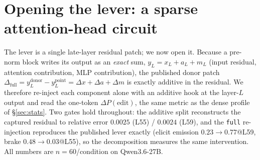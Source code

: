 
\section{Opening the lever: a sparse attention-head circuit}\label{sec:decomp}
The lever is a single late-layer residual patch; we now open it. Because a pre-norm block writes its output as
an \emph{exact} sum, $y_L = x_L + a_L + m_L$ (input residual, attention contribution, MLP contribution), the
published donor patch $\Delta_{\text{full}} = y^{\text{donor}}_L - y^{\text{point}}_L = \Delta x + \Delta a +
\Delta m$ is exactly additive in the residual. We therefore re-inject each component alone with an additive hook
at the layer-$L$ output and read the one-token $\Delta P(\text{edit})$, the same metric as the dense profile of
\S\ref{sec:stats}. Two gates hold throughout: the additive split reconstructs the captured residual to relative
error $0.0025$ (L55) / $0.0024$ (L59), and the \texttt{full} re-injection reproduces the published lever exactly
(elicit emission $0.23\!\to\!0.77$@L59, brake $0.48\!\to\!0.03$@L55), so the decomposition measures the same
intervention. All numbers are $n{=}60$/condition on Qwen3.6-27B.

